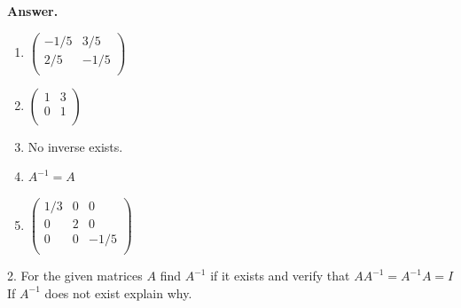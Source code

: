\documentclass[10pt,]{book}
\theoremstyle{plain}
\theoremstyle{definition}
\theoremstyle{definition}
\theoremstyle{definition}
\theoremstyle{definition}
\begin{document}
\begin{exercisegroup}
\noindent\textbf{Answer.}\hypertarget{answer-5}{}\quad
\leavevmode%
\begin{multicols}{2}
\begin{enumerate}[label=\alph*]
\item\hypertarget{li-53}{} \(\left(
\begin{array}{cc}
 -1/5 & 3/5 \\
 2/5 & -1/5 \\
\end{array}
\right)\)%
\item\hypertarget{li-54}{} \(\left(
\begin{array}{cc}
 1 & 3 \\
 0 & 1 \\
\end{array}
\right)\) %
\item\hypertarget{li-55}{}  No inverse exists.%
\item\hypertarget{li-56}{} \(A^{-1}=A\)   %
\item\hypertarget{li-57}{} \(\left(
\begin{array}{ccc}
 1/3 & 0 & 0 \\
 0 & 2 & 0 \\
 0 & 0 & -1/5 \\
\end{array}
\right)\)
%
\end{enumerate}
\end{multicols}
%
\item[2.]\hypertarget{exercise-9}{} For the given matrices \(A\) find \(A^{-1}\) if it exists and verify that \(A A^{-1}=A^{-1}A = I\) If \(A^{-1}\) does not exist
explain why.%
\par
\leavevmode%
\end{exercisegroup}
\end{document}
